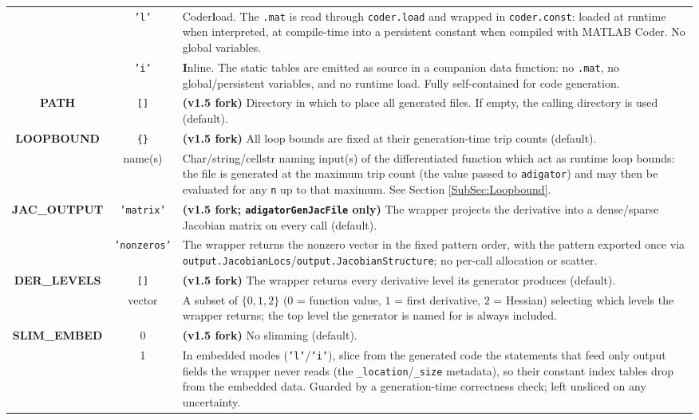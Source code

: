 \documentclass[10pt,pdftex]{article}
\begin{document}
\begin{table}[h]
\begin{tabular}{|c|c|p{12cm}|}
~ & \texttt{'l'} & Coder{\bf l}oad. The \texttt{.mat} is read through \texttt{coder.load} and wrapped in \texttt{coder.const}: loaded at runtime when interpreted, at compile-time into a persistent constant when compiled with MATLAB Coder. No global variables. \\ \cline{2-3}
~ & \texttt{'i'} & {\bf I}nline. The static tables are emitted as source in a companion data function: no \texttt{.mat}, no global/persistent variables, and no runtime load. Fully self-contained for code generation. \\ \hline
{\bf PATH} & \texttt{[]} & {\bf (v1.5 fork)} Directory in which to place all generated files. If empty, the calling directory is used (default). \\ \hline
{\bf LOOPBOUND} & \texttt{\{\}} & {\bf (v1.5 fork)} All loop bounds are fixed at their generation-time trip counts (default). \\ \cline{2-3}
~ & name(s) & Char/string/cellstr naming input(s) of the differentiated function which act as runtime loop bounds: the file is generated at the maximum trip count (the value passed to \texttt{adigator}) and may then be evaluated for any \texttt{n} up to that maximum. See Section \ref{SubSec:Loopbound}. \\ \hline
{\bf JAC\_OUTPUT} & \texttt{'matrix'} & {\bf (v1.5 fork; \texttt{adigatorGenJacFile} only)} The wrapper projects the derivative into a dense/sparse Jacobian matrix on every call (default). \\ \cline{2-3}
~ & \texttt{'nonzeros'} & The wrapper returns the nonzero vector in the fixed pattern order, with the pattern exported once via \texttt{output.JacobianLocs}/\texttt{output.JacobianStructure}; no per-call allocation or scatter. \\ \hline
{\bf DER\_LEVELS} & \texttt{[]} & {\bf (v1.5 fork)} The wrapper returns every derivative level its generator produces (default). \\ \cline{2-3}
~ & vector & A subset of $\{0,1,2\}$ ($0$ = function value, $1$ = first derivative, $2$ = Hessian) selecting which levels the wrapper returns; the top level the generator is named for is always included. \\ \hline
{\bf SLIM\_EMBED} & 0 & {\bf (v1.5 fork)} No slimming (default). \\ \cline{2-3}
~ & 1 & In embedded modes (\texttt{'l'}/\texttt{'i'}), slice from the generated code the statements that feed only output fields the wrapper never reads (the \texttt{\_location}/\texttt{\_size} metadata), so their constant index tables drop from the embedded data. Guarded by a generation-time correctness check; left unsliced on any uncertainty. \\ \hline
\end{tabular}
\end{table}
\end{document}
